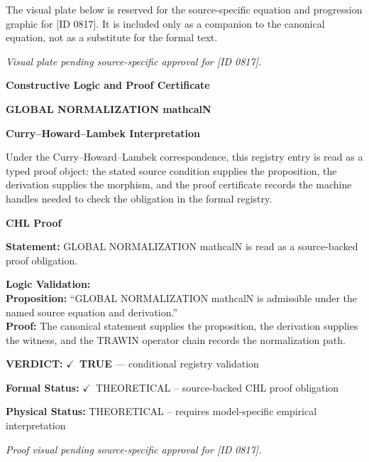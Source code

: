 \begingroup\footnotesize\sloppy
The visual plate below is reserved for the source-specific equation and progression graphic for [ID 0817]. It is included only as a companion to the canonical equation, not as a substitute for the formal text.
\par\endgroup
\begingroup\footnotesize\itshape
Visual plate pending source-specific approval for [ID 0817].
\par\endgroup

\clearpage
\begingroup\tzpsupportsetup
\noindent\textbf{\fontsize{10.8pt}{12.8pt}\selectfont [ID 0817] Constructive Logic and Proof Certificate}\par
\noindent\textbf{\fontsize{10pt}{12pt}\selectfont GLOBAL NORMALIZATION mathcalN}\par
\vspace{0.45em}
\begingroup
\footnotesize
\setlength{\parskip}{0.22em}
\setlength{\parindent}{0pt}
\noindent\textbf{Curry--Howard--Lambek Interpretation}\par
Under the Curry--Howard--Lambek correspondence, this registry entry is read as a typed proof
object: the stated source condition supplies the proposition, the derivation supplies the
morphism, and the proof certificate records the machine handles needed to check the obligation
in the formal registry.

\vspace{0.45em}
\noindent\textbf{CHL Proof}\par
\textbf{Statement:} GLOBAL NORMALIZATION mathcalN is read as a source-backed proof obligation.

\textbf{Logic Validation:}\\
\textbf{Proposition:} ``GLOBAL NORMALIZATION mathcalN is admissible under the named source equation and derivation.''\\
\textbf{Proof:} The canonical statement supplies the proposition, the derivation supplies the witness, and the TRAWIN operator chain records the normalization path.

\textbf{VERDICT:} \ensuremath{\checkmark}\ \textbf{TRUE} --- conditional registry validation

\textbf{Formal Status:} \ensuremath{\checkmark}\ THEORETICAL -- source-backed CHL proof obligation

\textbf{Physical Status:} THEORETICAL -- requires model-specific empirical interpretation
\par\vspace{0.45em}
\par
\vfill
\begingroup\footnotesize\itshape
Proof visual pending source-specific approval for [ID 0817].
\par\endgroup
\vfill
\endgroup
\endgroup
